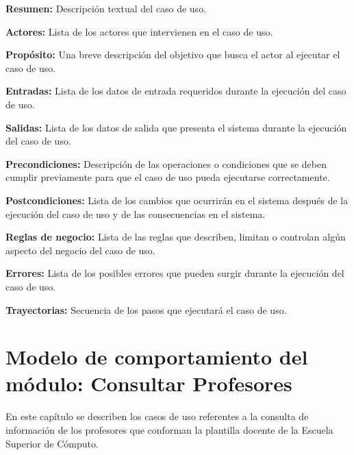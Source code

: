 \documentclass[10pt]{book}
\begin{document}
     \begin{objetivos}
	\item {\bf Resumen:} Descripción textual del caso de uso.
	\item {\bf Actores:} Lista de los actores que intervienen en el caso de uso.
	\item {\bf Propósito:} Una breve descripción del objetivo que busca el actor al ejecutar el caso de uso.
	\item {\bf Entradas:} Lista de los datos de entrada requeridos durante la ejecución del caso de uso.
	\item {\bf Salidas:} Lista de los datos de salida que presenta el sistema durante la ejecución del caso de uso.
	\item {\bf Precondiciones:} Descripción de las operaciones o condiciones que se deben cumplir previamente para que el caso de uso pueda ejecutarse correctamente.
	\item {\bf Postcondiciones:} Lista de los cambios que ocurrirán en el sistema después de la ejecución del caso de uso y de las consecuencias en el sistema.
	\item {\bf Reglas de negocio:} Lista de las reglas que describen, limitan o controlan algún aspecto del negocio del caso de uso.
	\item {\bf Errores:} Lista de los posibles errores que pueden surgir durante la ejecución del caso de uso.
	\item {\bf Trayectorias:} Secuencia de los pasos que ejecutará el caso de uso.
    \end{objetivos}

	
\chapter{Modelo de comportamiento del módulo: Consultar Profesores \label{chp:modeloComportamientoInformacionBase}}
     
  En este capítulo se describen los casos de uso referentes a la consulta de información de los profesores que conforman la plantilla docente de la Escuela Superior de Cómputo. \bigskip
\end{document}
